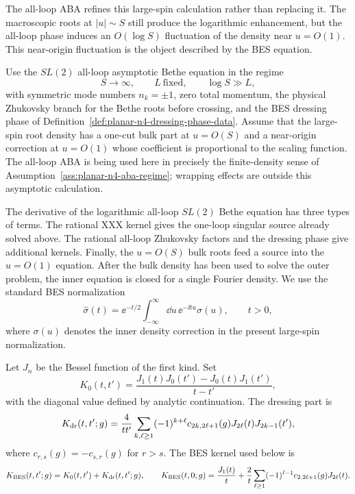 The all-loop ABA refines this large-spin calculation rather than replacing
it.  The macroscopic roots at \(|u|\sim S\) still produce the logarithmic
enhancement, but the all-loop phase induces an \(O(\log S)\) fluctuation of
the density near \(u=O(1)\).  This near-origin fluctuation is the object
described by the BES equation.

\begin{assumption}
\label{ass:planar-n4-bes-scaling-regime}
Use the \(SL(2)\) all-loop asymptotic Bethe equation in the regime
\[
  S\to\infty,\qquad L\ \text{fixed},\qquad \log S\gg L,
\]
with symmetric mode numbers \(n_k=\pm1\), zero total momentum, the physical
Zhukovsky branch for the Bethe roots before crossing, and the BES dressing
phase of Definition~\ref{def:planar-n4-dressing-phase-data}.  Assume that the
large-spin root density has a one-cut bulk part at \(u=O(S)\) and a
near-origin correction at \(u=O(1)\) whose coefficient is proportional to
the scaling function.  The all-loop ABA is being used here in precisely the
finite-density sense of Assumption~\ref{ass:planar-n4-aba-regime}; wrapping
effects are outside this asymptotic calculation.
\end{assumption}

The derivative of the logarithmic all-loop \(SL(2)\) Bethe equation has three
types of terms.  The rational XXX kernel gives the one-loop singular source
already solved above.  The rational all-loop Zhukovsky factors and the
dressing phase give additional kernels.  Finally, the \(u=O(S)\) bulk roots
feed a source into the \(u=O(1)\) equation.  After the bulk density has been
used to solve the outer problem, the inner equation is closed for a single
Fourier density.  We use the standard BES normalization
\[
  \widehat\sigma(t)
  =
  \ee^{-t/2}\int_{-\infty}^{\infty}\dd u\,
  \ee^{-\ii t u}\sigma(u),
  \qquad t>0,
\]
where \(\sigma(u)\) denotes the inner density correction in the present
large-spin normalization.

\begin{definition}
\label{def:planar-n4-bes-kernel}
Let \(J_n\) be the Bessel function of the first kind.  Set
\begin{equation}
  K_0(t,t')
  =
  \frac{J_1(t)J_0(t')-J_0(t)J_1(t')}{t-t'},
  \label{eq:planar-n4-bes-rational-kernel}
\end{equation}
with the diagonal value defined by analytic continuation.  The dressing part
is
\begin{equation}
  K_{\rm dr}(t,t';g)
  =
  \frac{4}{tt'}
  \sum_{k,\ell\geq1}
  (-1)^{k+\ell}c_{2k,2\ell+1}(g)
  J_{2\ell}(t)J_{2k-1}(t'),
  \label{eq:planar-n4-bes-dressing-kernel}
\end{equation}
where \(c_{r,s}(g)=-c_{s,r}(g)\) for \(r>s\).  The BES kernel used below is
\[
  K_{\rm BES}(t,t';g)=K_0(t,t')+K_{\rm dr}(t,t';g),
  \qquad
  K_{\rm BES}(t,0;g)
  =
  \frac{J_1(t)}{t}
  +
  \frac{2}{t}\sum_{\ell\geq1}
  (-1)^{\ell-1}c_{2,2\ell+1}(g)J_{2\ell}(t).
\]
\end{definition}

